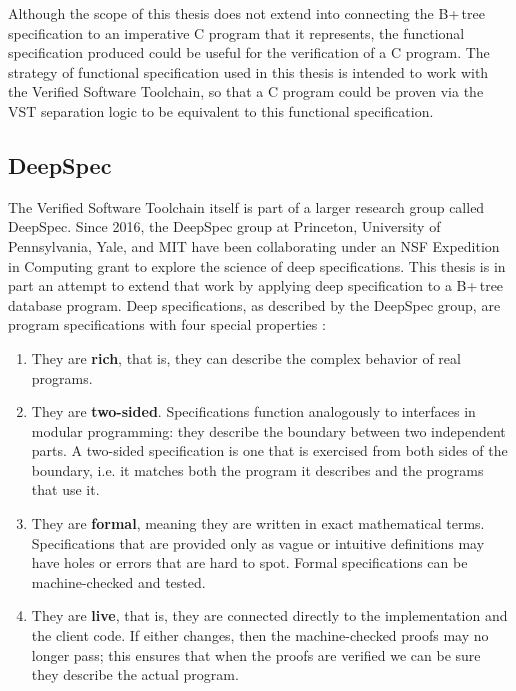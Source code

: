\documentclass[a4paper,12pt]{article}
\begin{document}
Although the scope of this thesis does not extend into connecting the B+\,tree specification to an imperative C program that it represents, the functional specification produced could be useful for the verification of a C program. The strategy of functional specification used in this thesis is intended to work with the Verified Software Toolchain, so that a C program could be proven via the VST separation logic to be equivalent to this functional specification.

\subsection{DeepSpec}

The Verified Software Toolchain itself is part of a larger research group called DeepSpec. Since 2016, the DeepSpec group at Princeton, University of Pennsylvania, Yale, and MIT have been collaborating under an NSF Expedition in Computing grant to explore the science of deep specifications. This thesis is in part an attempt to extend that work by applying deep specification to a B+\,tree database program. Deep specifications, as described by the DeepSpec group, are program specifications with four special properties \cite{deepspec}:

\begin{enumerate}
\item They are \textbf{rich}, that is, they can describe the complex behavior of real programs.
 
\item They are \textbf{two-sided}. Specifications function analogously to interfaces in modular programming: they describe the boundary between two independent parts. A two-sided specification is one that is exercised from both sides of the boundary, i.e. it matches both the program it describes and the programs that use it.

\item They are \textbf{formal}, meaning they are written in exact mathematical terms. Specifications that are provided only as vague or intuitive definitions may have holes or errors that are hard to spot. Formal specifications can be machine-checked and tested.

\item They are \textbf{live}, that is, they are connected directly to the implementation and the client code. If either changes, then the machine-checked proofs may no longer pass; this ensures that when the proofs are verified we can be sure they describe the actual program.
\end{enumerate}
\end{document}
